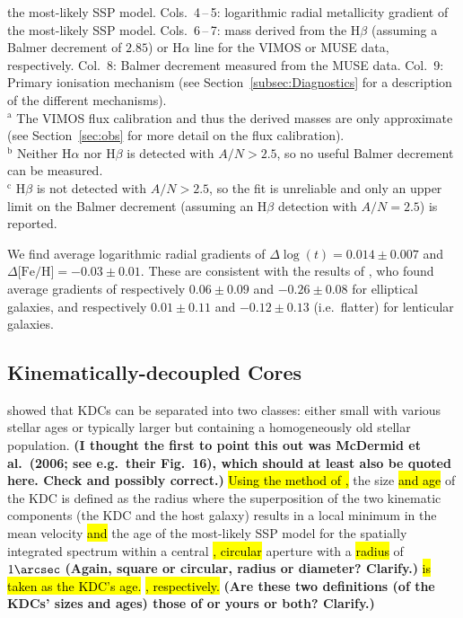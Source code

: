 \documentclass[a4paper,fleqn,usenatbib]{mnras}
\DeclareRobustCommand{\removed}[1]{{\sethlcolor{red}\hl{#1}}}
\DeclareRobustCommand{\added}[1]{{\sethlcolor{green}\hl{#1}}}
\begin{document}
\begin{table}
\begin{center}
{      the most-likely SSP model. Cols.~4\,--\,5: logarithmic radial
      metallicity gradient of the most-likely SSP
      model. Cols.~6\,--\,7:  mass derived from the
      H$\beta$ (assuming a Balmer decrement of $2.85$) or H$\alpha$
      line for the VIMOS or MUSE data, respectively. Col.~8: Balmer
      decrement measured from the MUSE data. Col.~9: Primary
      ionisation mechanism (see Section~\ref{subsec:Diagnostics} for a
      description of the different mechanisms).\\
      $^\text{a}$ The VIMOS flux calibration and thus the derived
       masses are only approximate (see
      Section~\ref{sec:obs} for more detail on the flux
      calibration).\\
      $^\text{b}$ Neither H$\alpha$ nor H$\beta$ is detected with
      $A/N>2.5$, so no useful Balmer decrement can be measured.\\
      $^\text{c}$ H$\beta$ is not detected with $A/N>2.5$, so the fit
      is unreliable and only an upper limit on the Balmer decrement
      (assuming an H$\beta$ detection with $A/N=2.5$) is reported.}
  \end{center}
\end{table}
  
We find average logarithmic radial gradients of
$\Delta\log(t)=0.014\pm0.007$ and
$\Delta\text{[Fe/H]}=-0.03\pm0.01$. These are consistent with the
results of \citet{Koleva2011}, who found average gradients of
respectively $0.06\pm0.09$ and $-0.26\pm0.08$ for elliptical galaxies,
and respectively $0.01\pm0.11$ and $-0.12\pm0.13$ (i.e.\ flatter) for
lenticular galaxies.

\subsection{Kinematically-decoupled Cores}
\label{subsec:popKDC}

\added{\citet{McDermid2006}} \removed{\citet{Kuntschner2010}} showed that 
KDCs can be separated into two classes: either small with various stellar 
ages or typically larger but containing a homogeneously old stellar 
population. {\bf (I thought the first to point this out was 
McDermid et al.\ (2006; see e.g.\ their Fig.~16), which should at 
least also be quoted here. Check and possibly correct.)} 
\added{Using the method of \citet{McDermid2006},} the size 
\added{and age} of the KDC is defined as the radius
where the superposition of the two kinematic components (the KDC and
the host galaxy) results in a local minimum in the mean velocity \added{and} the
age of the most-likely SSP model for the spatially integrated spectrum
within a central \added{, circular} aperture with a \added{radius} of 
$1\arcsec$ {\bf (Again, square or circular, radius or diameter? Clarify.)} 
\removed{is taken as the KDC's age.} \added{, respectively.} 
{\bf (Are these two definitions (of the KDCs' sizes and ages) 
those of \citealt{Kuntschner2010} or yours or both? Clarify.)}
\end{document}
